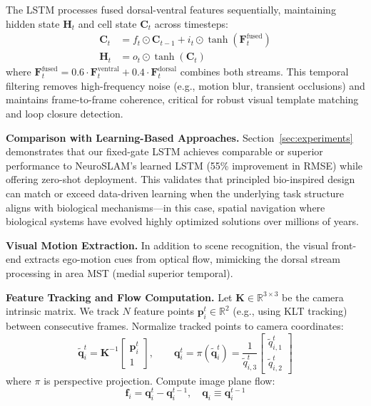 The LSTM processes fused dorsal-ventral features sequentially, maintaining hidden state $\mathbf{H}_t$ and cell state $\mathbf{C}_t$ across timesteps:
\begin{align}
    \mathbf{C}_t & = f_t \odot \mathbf{C}_{t-1} + i_t \odot \tanh(\mathbf{F}^{\text{fused}}_t) \\
    \mathbf{H}_t & = o_t \odot \tanh(\mathbf{C}_t)
\end{align}
where $\mathbf{F}^{\text{fused}}_t = 0.6 \cdot \mathbf{F}^{\text{ventral}}_t + 0.4 \cdot \mathbf{F}^{\text{dorsal}}_t$ combines both streams. This temporal filtering removes high-frequency noise (e.g., motion blur, transient occlusions) and maintains frame-to-frame coherence, critical for robust visual template matching and loop closure detection.

\textbf{Comparison with Learning-Based Approaches.} Section~\ref{sec:experiments} demonstrates that our fixed-gate LSTM achieves comparable or superior per\-for\-mance to NeuroSLAM's learned LSTM (55\% improvement in RMSE) while offering zero-shot deployment. This validates that principled bio-inspired design can match or exceed data-driven learning when the underlying task structure aligns with biological mechanisms---in this case, spatial navigation where biological systems have evolved highly optimized solutions over millions of years.

\textbf{Visual Motion Extraction.} In addition to scene recognition, the visual front-end extracts ego-motion cues from optical flow, mimicking the dorsal stream processing in area MST (medial superior temporal).

\textbf{Feature Tracking and Flow Computation.} Let $\mathbf{K}\in\mathbb{R}^{3\times 3}$ be the camera intrinsic matrix. We track $N$ feature points $\mathbf{p}_i^t\in\mathbb{R}^2$ (e.g., using KLT tracking) between consecutive frames. Normalize tracked points to camera coordinates:
\begin{equation}
    \tilde{\mathbf{q}}_i^t = \mathbf{K}^{-1}\begin{bmatrix}\mathbf{p}_i^t\\ 1\end{bmatrix},\qquad \mathbf{q}_i^t = \pi(\tilde{\mathbf{q}}_i^t)=\frac{1}{\tilde{q}_{i,3}^t}\begin{bmatrix}\tilde{q}_{i,1}^t\\ \tilde{q}_{i,2}^t\end{bmatrix}
\end{equation}
where $\pi$ is perspective projection. Compute image plane flow:
\begin{equation}
    \mathbf{f}_i=\mathbf{q}_i^t-\mathbf{q}_i^{t-1},\quad \mathbf{q}_i\equiv\mathbf{q}_i^{t-1}
\end{equation}

